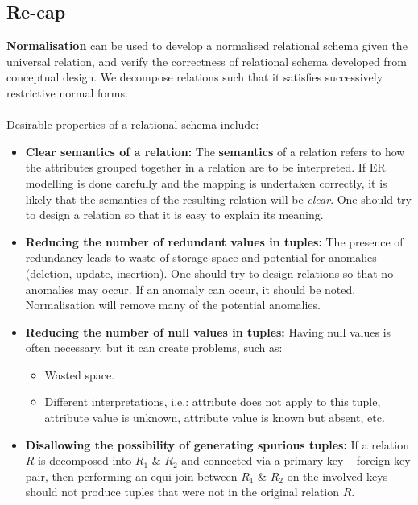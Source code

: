 \documentclass[a4paper,11pt]{article}
\begin{document}
\subsection{Re-cap}
\textbf{Normalisation} can be used to develop a normalised relational schema given the universal relation, and verify 
the correctness of relational schema developed from conceptual design.
We decompose relations such that it satisfies successively restrictive normal forms.
\\\\
Desirable properties of a relational schema include:
\begin{itemize}
    \item   \textbf{Clear semantics of a relation:} The \textbf{semantics} of a relation refers to how the attributes
            grouped together in a relation are to be interpreted. 
            If ER modelling is done carefully and the mapping  is undertaken correctly, it is likely that the semantics of 
            the resulting relation will be \emph{clear}.
            One should try to design a relation so that it is easy to explain its meaning.
    \item   \textbf{Reducing the number of redundant values in tuples:} The presence of redundancy leads to waste of
            storage space and potential for anomalies (deletion, update, insertion).
            One should try to design relations so that no anomalies may occur. If an anomaly can occur, it should be noted.
            Normalisation will remove many of the potential anomalies.
    \item   \textbf{Reducing the number of null values in tuples:} Having null values is often necessary, but it can
            create problems, such as:
            \begin{itemize}
                \item   Wasted space. 
                \item   Different interpretations, i.e.: attribute does not apply to this tuple, attribute value is 
                        unknown, attribute value is known but absent, etc.
            \end{itemize}

    \item   \textbf{Disallowing the possibility of generating spurious tuples:} If a relation $R$ is decomposed into $R_1$
            \& $R_2$ and connected via a primary key -- foreign key pair, then performing an equi-join between $R_1$ \&
            $R_2$ on the involved keys should not produce tuples that were not in the original relation $R$.
\end{itemize}
\end{document}
